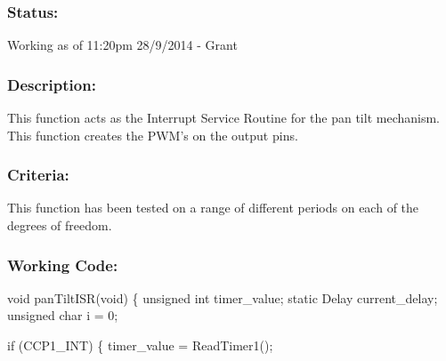 \documentclass[]{article}
\begin{document}
\subsubsection{Status:}
Working as of 11:20pm 28/9/2014 - Grant

\subsubsection{Description:}
This function acts as the Interrupt Service Routine for the pan tilt mechanism. This function creates the PWM's on the output pins.

\subsubsection{Criteria:}
This function has been tested on a range of different periods on each of the degrees of freedom.

\subsubsection{Working Code:}
void panTiltISR(void) \newline
\{ \newline
	unsigned int timer\_value; \newline
	static Delay current\_delay;\newline
	unsigned char i = 0;\newline
	
	if (CCP1\_INT) \newline
	\{ \newline
		timer\_value = ReadTimer1();\newline
		
\end{document}
